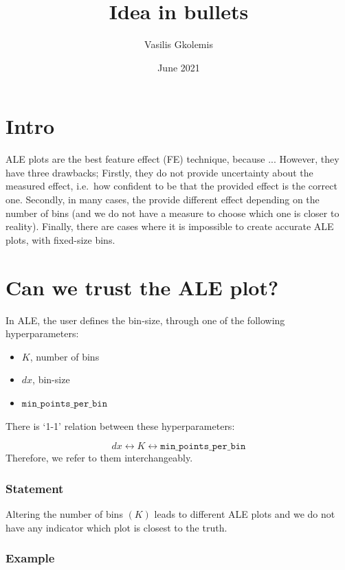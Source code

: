 \documentclass{article}
\title{Idea in bullets}
\author{Vasilis Gkolemis}
\date{June 2021}
\begin{document}
\maketitle


\section{Intro}

ALE plots are the best feature effect (FE) technique, because ...
However, they have three drawbacks; Firstly, they do not provide
uncertainty about the measured effect, i.e.\ how confident to be that
the provided effect is the correct one. Secondly, in many cases, the
provide different effect depending on the number of bins (and we do
not have a measure to choose which one is closer to reality). Finally,
there are cases where it is impossible to create accurate ALE plots,
with fixed-size bins.


\section{Can we trust the ALE plot?}

In ALE, the user defines the bin-size, through one of the following
hyperparameters:

\begin{itemize}
\item \(K\), number of bins
\item \(dx\), bin-size
\item \(\texttt{min\_points\_per\_bin}\)
\end{itemize}
%
There is `1-1' relation between these hyperparameters:

\begin{equation*}
 dx \leftrightarrow K \leftrightarrow \texttt{min\_points\_per\_bin}
\end{equation*}
%
Therefore, we refer to them interchangeably.


\subsubsection*{Statement}

Altering the number of bins \( (K) \) leads to different ALE plots and
we do not have any indicator which plot is closest to the truth.

\subsubsection*{Example}
\end{document}
